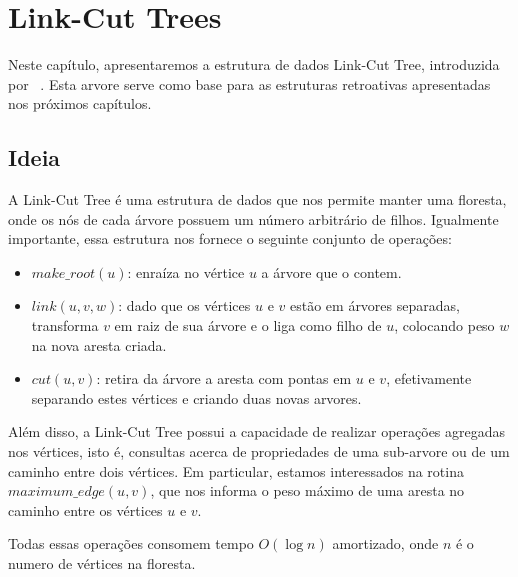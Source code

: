 
\chapter{Link-Cut Trees}
\label{cap:link-cut-trees}

Neste capítulo, apresentaremos a estrutura de dados Link-Cut Tree, introduzida por ~\citet{10.1145/800076.802464}. Esta arvore serve como base para as estruturas retroativas apresentadas nos próximos capítulos.

\section{Ideia}
\label{sec:lct-ideia}

A Link-Cut Tree é uma estrutura de dados que nos permite manter uma floresta, onde os nós de cada árvore possuem um número arbitrário de filhos. Igualmente importante, essa estrutura nos fornece o seguinte conjunto de operações:

\begin{itemize}
    \item $make\_root(u)$: enraíza no vértice $u$ a árvore que o contem.
    \item $link(u, v, w)$: dado que os vértices $u$ e $v$ estão em árvores separadas, transforma $v$ em raiz de sua árvore e o liga como filho de $u$, colocando peso $w$ na nova aresta criada.
    \item $cut(u, v)$: retira da árvore a aresta com pontas em $u$ e $v$, efetivamente separando estes vértices e criando duas novas arvores.
\end{itemize}

Além disso, a Link-Cut Tree possui a capacidade de realizar operações agregadas nos vértices, isto é, consultas acerca de propriedades de uma sub-arvore ou de um caminho entre dois vértices. Em particular, estamos interessados na rotina $maximum\_edge(u, v)$, que nos informa o peso máximo de uma aresta no caminho entre os vértices $u$ e $v$.

Todas essas operações consomem tempo $O(\log n)$ amortizado, onde $n$ é o numero de vértices na floresta.

